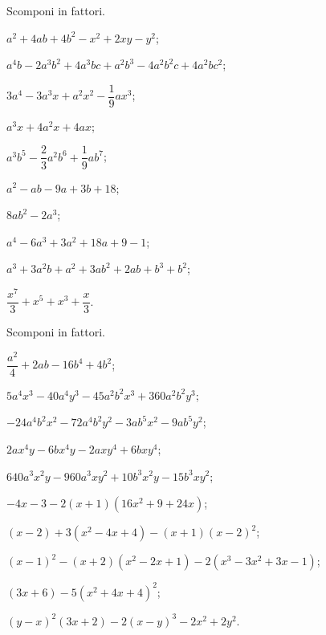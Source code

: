 \begin{esercizio}[\Ast]
 \label{ese:17.26.}
 Scomponi in fattori.

 \begin{enumeratea}
\item $a^{2}+4{ab}+4b^{2}-x^{2}+2xy-y^{2}$;
\item $a^{4}b-2a^{3}b^{2}+4a^{3}{bc}+a^{2}b^{3}-4a^{2}b^{2}c+4a^{2}bc^{2}$;
\item $3a^{4}-3a^{3}x+a^{2}x^{2}-\dfrac{1}{9}ax^{3}$;
\item $a^{3}x+4a^{2}x+4ax$;
\item $a^{3}b^{5}-\dfrac{2}{3}a^{2}b^{6}+\dfrac{1}{9}ab^{7}$;
\item $a^{2}-{ab}-9a+3b+18$;
\item $8{ab}^{2}-2a^{3}$;
\item $a^{4}-6a^{3}+3a^{2}+18a+9-1$;
\item $a^{3}+3a^{2}b+a^{2}+3{ab}^{2}+2{ab}+b^{3}+b^{2}$;
\item $\dfrac{x^{7}}{3}+x^{5}+x^{3}+\dfrac{x}{3}$.
 \end{enumeratea}

\end{esercizio}


\begin{esercizio}[\Ast]
 \label{ese:17.27}
 Scomponi in fattori.

 \begin{enumeratea}
  \item $\dfrac{a^{2}}{4}+2{ab}-16b^{4}+4b^{2}$;
\item $5a^{4}x^{3}-40a^{4}y^{3}-45a^{2}b^{2}x^{3}+360a^{2}b^{2}y^{3}$;
\item $-24a^{4}b^{2}x^{2}-72a^{4}b^{2}y^{2}-3ab^{5}x^{2}-9ab^{5}y^{2}$;
\item $2ax^{4}y-6bx^{4}y-2axy^{4}+6bxy^{4}$;
\item $640a^{3}x^{2}y-960a^{3}xy^{2}+10b^{3}x^{2}y-15b^{3}xy^{2}$;
\item $-4x-3-2(x+1)(16x^{2}+9+24x)$;
\item $(x-2)+3(x^{2}-4x+4)-(x+1)(x-2)^{2}$;
\item $(x-1)^{2}-(x+2)(x^{2}-2x+1)-2(x^{3}-3x^{2}+3x-1)$;
\item $(3x+6)-5(x^{2}+4x+4)^{2}$;
\item $(y-x)^{2}(3x+2)-2(x-y)^{3}-2x^{2}+2y^{2}$.
 \end{enumeratea}

\end{esercizio}


